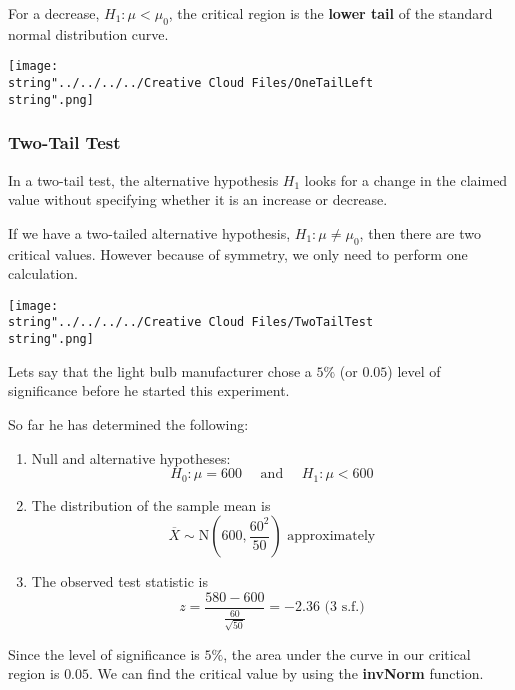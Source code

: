 \documentclass[11pt,a4paper]{book}
\begin{document}
\begin{minipage}[t]{.5\textwidth}

For a decrease, $H_{1}:\mu<\mu_{0}$, the critical region is the \textbf{lower
tail} of the standard normal distribution curve.

\end{minipage}
\begin{minipage}[t]{.5\textwidth}
\begin{center}
\texttt{[image: \\string"../../../../Creative Cloud Files/OneTailLeft\\string".png]}
\par\end{center}

\end{minipage}

\subsubsection*{Two-Tail Test}

In a two-tail test, the alternative hypothesis $H_{1}$ looks for
a change in the claimed value without specifying whether it is an
increase or decrease.

If we have a two-tailed alternative hypothesis, $H_{1}:\mu\neq\mu_{0}$,
then there are two critical values. However because of symmetry, we
only need to perform one calculation.
\begin{center}
\texttt{[image: \\string"../../../../Creative Cloud Files/TwoTailTest\\string".png]}
\par\end{center}

\newpage

Lets say that the light bulb manufacturer chose a $5\%$ (or $0.05$)
level of significance before he started this experiment.

So far he has determined the following:
\begin{enumerate}
\item Null and alternative hypotheses:
\[
H_{0}:\mu=600\quad\text{ and }\quad H_{1}:\mu<600
\]
\item The distribution of the sample mean is 
\[
\overline{X}\sim\text{N}\left(600,\frac{60^{2}}{50}\right)\text{ approximately}
\]
\item The observed test statistic is
\[
{\displaystyle z=\frac{580-600}{\frac{60}{\sqrt{50}}}}=-2.36\text{ (3 s.f.)}
\]
\end{enumerate}
Since the level of significance is $5\%$, the area under the curve
in our critical region is $0.05$. We can find the critical value
by using the \textbf{invNorm} function. 
\end{document}
